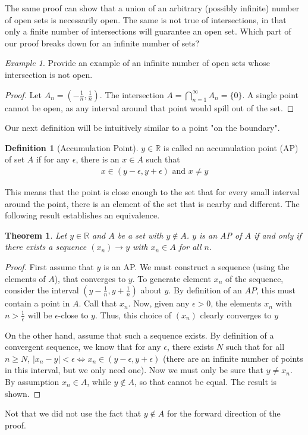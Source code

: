 \documentclass[11pt]{article}
\newcommand{\R}{\ensuremath{\mathbb R}}
\newcommand{\e}{\epsilon}
\theoremstyle{plain}
\newtheorem{thm}{Theorem}[section]
\theoremstyle{definition}
\newtheorem{defi}{Definition}[section]
\theoremstyle{remark}
\newtheorem{exm}{Example}[section]
\begin{document}
The same proof can show that a union of an arbitrary (possibly infinite) number of open sets is necessarily open. The same is not true of intersections, in that only a finite number of intersections will guarantee an open set. Which part of our proof breaks down for an infinite number of sets?
\begin{exm}
    Provide an example of an infinite number of open sets whose intersection is not open.
\end{exm}
\begin{proof}
    Let $A_n = (-\frac{1}{n}, \frac{1}{n})$. The intersection $A = \bigcap_{n=1}^\infty A_n = \{0\}$. A single point cannot be open, as any interval around that point would spill out of the set.
\end{proof}

Our next definition will be intuitively similar to a point "on the boundary".
\begin{defi}[Accumulation Point]
    $y \in \R$ is called an accumulation point (AP) of set $A$ if for any $\e$, there is an $x \in A$ such that
    \begin{align*}
        x \in (y - \e, y + \e) \text{ and } x \neq y
    \end{align*}
\end{defi}
This means that the point is close enough to the set that for every small interval around the point, there is an element of the set that is nearby and different. The following result establishes an equivalence.
\begin{thm}
    Let $y \in \R$ and $A$ be a set with $y \notin A$. $y$ is an AP of $A$ if and only if there exists a sequence $(x_n) \rightarrow y$ with $x_n \in A$ for all $n$.
    \label{thm:ap}
\end{thm}
\begin{proof}
    First assume that $y$ is an AP. We must construct a sequence (using the elements of $A$), that converges to $y$. To generate element $x_n$ of the sequence, consider the interval $(y - \frac{1}{n}, y + \frac{1}{n})$ about $y$. By definition of an $AP$, this must contain a point in $A$. Call that $x_n$. Now, given any $\e > 0$, the elements $x_n$ with $n > \frac{1}{\e}$ will be $\e$-close to $y$. Thus, this choice of $(x_n)$ clearly converges to $y$
    
    On the other hand, assume that such a sequence exists. By definition of a convergent sequence, we know that for any $\e$, there exists $N$ such that for all $n \geq N$, $|x_n - y| < \e \iff x_n \in (y - \e, y + \e)$ (there are an infinite number of points in this interval, but we only need one). Now we must only be sure that $y \neq x_n$. By assumption $x_n \in A$, while $y \notin A$, so that cannot be equal. The result is shown.
\end{proof}
Not that we did not use the fact that $y \notin A$ for the forward direction of the proof.
\end{document}
